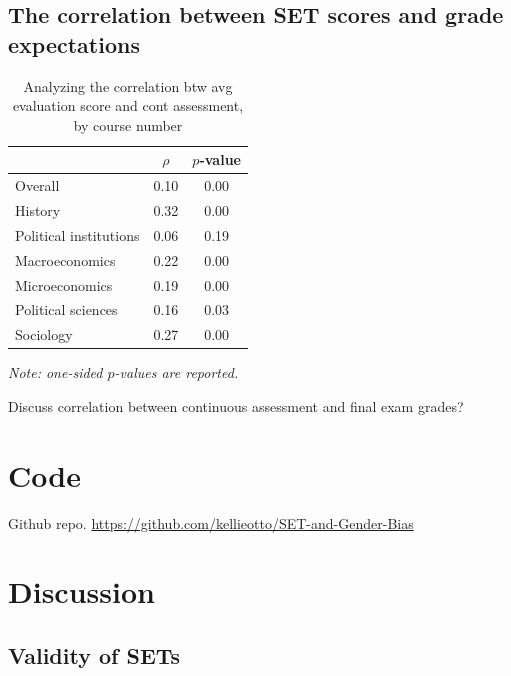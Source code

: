 \documentclass[12pt]{article}
\begin{document}
\subsection{The correlation between SET scores and grade expectations}
\begin{table}[htbp]
  \centering
  \footnotesize 
  \caption{Analyzing the correlation btw avg evaluation score and cont assessment, by course number}
    \begin{tabular}{lcc}
    \toprule 
                          & $\rho$  & $p$-value  \\
   \midrule
    Overall &                 0.10       & 0.00   \\
    History &                 0.32       & 0.00   \\
    Political institutions &  0.06       & 0.19     \\
    Macroeconomics &          0.22       & 0.00    \\
    Microeconomics &          0.19       & 0.00     \\
    Political sciences &      0.16       & 0.03     \\
    Sociology &               0.27       & 0.00     \\
    \bottomrule
    \end{tabular}%
 \label{tab:instructor gender}%
  
  \textit{Note: one-sided $p$-values are reported.}
\end{table}%
\normalsize



Discuss correlation between continuous assessment and final exam grades? 









\section{Code}
Github repo. \url{https://github.com/kellieotto/SET-and-Gender-Bias}

\section{Discussion}

\subsection{Validity of SETs}
\end{document}

